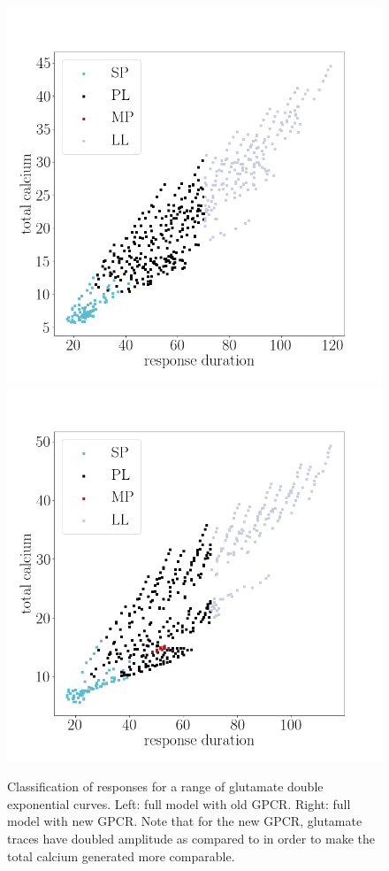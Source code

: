 \documentclass[12pt]{article}
\begin{document}
\begin{figure}[H]
	\includegraphics[width=0.45\linewidth]{glut_classification.png}
	\includegraphics[width=0.45\linewidth]{glut_classification_new2.png}
	\centering
	\caption{Classification of responses for a range of glutamate double exponential curves. Left: full model with old GPCR. Right: full model with new GPCR. Note that for the new GPCR, glutamate traces have doubled amplitude as compared to \cite{taheri2017diversity} in order to make the total calcium generated more comparable.}
	\label{fig:glut_classification}
\end{figure}
\end{document}
